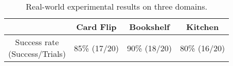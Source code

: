 \begin{table}[ht]
\centering
\setlength\tabcolsep{10 pt}
\begin{adjustbox}{max width=\columnwidth}
\begin{tabular}{cccc}
\toprule
           & \textbf{Card Flip} & \textbf{Bookshelf} & \textbf{Kitchen} \\
\midrule
\makecell{Success rate \\ (Success/Trials)}  &  85\% (17/20)   & 90\% (18/20)   &  80\% (16/20) \\
\bottomrule
\end{tabular}
\end{adjustbox}
\caption{Real-world experimental results on three domains.}
\label{table:real_world_result}
\vspace{-3mm}
\end{table}